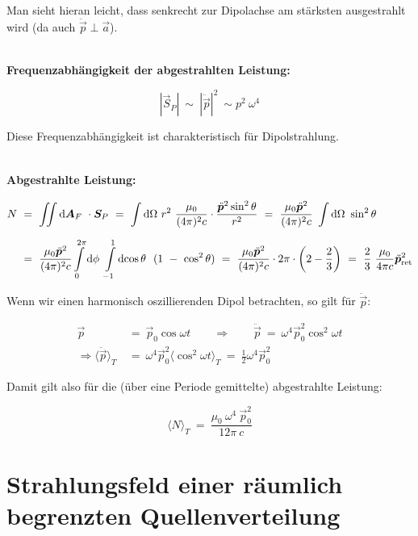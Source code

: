 Man sieht hieran leicht, dass senkrecht zur Dipolachse am stärksten ausgestrahlt wird (da auch $\ddot{\vec{p}}\perp \vec{a}$).

\ \\
\textbf{Frequenzabhängigkeit der abgestrahlten Leistung:}

\begin{equation*}
|\vec{S}_P|  \ \sim \ |\ddot{\vec{p}}|^2 \ \sim p^2 \ \omega^4
\end{equation*}

Diese Frequenzabhängigkeit ist charakteristisch für Dipolstrahlung.

\ \\
\textbf{Abgestrahlte Leistung:}

\begin{align*}
N  \ &= \ \Iint{}{}{\vec{A}_F} \cdot \vec{S}_P  \ = \ \Int{}{}{\Omega}r^2 \ \frac{\mu_0}{(4\pi)^2c}\cdot\frac{\ddot{\vec{p}}^2\sin^2\theta}{r^2}  \ = \ \frac{\mu_0\ddot{\vec{p}}^2}{(4\pi)^2c} \ \Int{}{}{\Omega}\sin^2\theta\\
&= \ \frac{\mu_0\ddot{\vec{p}}^2}{(4\pi)^2c} \Int{0}{2\pi}{\phi}\Int{-1}{1}{\cos\theta} \ (1 \ - \ \cos^2\theta) \ = \ \frac{\mu_0\ddot{\vec{p}}^2}{(4\pi)^2c} \cdot 2\pi \cdot \left(2-\frac{2}{3}\right) \ = \ \frac{2}{3} \ \frac{\mu_0}{4\pi c} \ddot{\vec{p}}^2_{\text{ret}}
\end{align*}

Wenn wir einen harmonisch oszillierenden Dipol betrachten, so gilt für $\ddot{\vec{p}}$:

\begin{align*}
\vec{p}  \ &= \ \vec{p}_0 \cos\omega t \qquad \Rightarrow \qquad \ddot{\vec{p}}  \ = \ \omega^4\vec{p}_0^2\cos^2\omega t\\
\Rightarrow \langle\ddot{\vec{p}}\rangle_T  \ &= \  \omega^4\vec{p}_0^2 \langle\cos^2\omega t\rangle_T  \ = \ \frac{1}{2} \omega^4 \vec{p}_0^2
\end{align*}

Damit gilt also für die (über eine Periode gemittelte) abgestrahlte Leistung:

\begin{equation*}
\langle N \rangle_T  \ = \  \frac{\mu_0 \ \omega^4\ \vec{p}_0^2}{12\pi \ c}
\end{equation*}

\section{Strahlungsfeld einer räumlich begrenzten Quellenverteilung}

